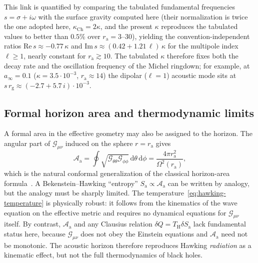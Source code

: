\documentclass[12pt,a4paper,preprint]{elsarticle}
\begin{document}
            This link is quantified by comparing the tabulated fundamental frequencies $s=\sigma+i\omega$ with the surface gravity computed here (their normalization is twice the one adopted here, $\kappa_{\mathrm{Ch}}=2\kappa$, and the present $\kappa$ reproduces the tabulated values to better than $0.5\%$ over $r_{\mathrm{a}}=3$--$30$), yielding the convention-independent ratios $\mathrm{Re}\,s\approx-0.77\,\kappa$ and $\mathrm{Im}\,s\approx(0.42+1.21\,\ell)\,\kappa$ for the multipole index $\ell\ge 1$, nearly constant for $r_{\mathrm{a}}\gtrsim 10$. The tabulated $\kappa$ therefore fixes both the decay rate and the oscillation frequency of the Michel ringdown; for example, at $a_{\infty}=0.1$ ($\kappa=3.5\cdot10^{-3}$, $r_{\mathrm{a}}\approx14$) the dipolar ($\ell=1$) acoustic mode sits at $s\,r_{\mathrm{g}}\approx(-2.7+5.7\,i)\cdot10^{-3}$.

        \subsection{Formal horizon area and thermodynamic limits}\label{subsec:thermodynamic-limits}
            A formal area in the effective geometry may also be assigned to the horizon. The angular part of $\mathcal{G}_{\mu\nu}$ induced on the sphere $r=r_{\mathrm{a}}$ gives
            \begin{equation}
                \mathcal{A}_{\mathrm{a}} = \oint\sqrt{\mathcal{G}_{\theta\theta}\mathcal{G}_{\phi\phi}}\,\mathrm{d}\theta\,\mathrm{d}\phi = \frac{4\pi r^{2}_{\mathrm{a}}}{\Omega^{2}(r_{\mathrm{a}})} ,
                \label{eq:acoustic-horizon-area}
            \end{equation}
            which is the natural conformal generalization of the classical horizon-area formula~\cite{ShapiroSL_TeukolskySA_BlackHolesWhiteDwarfsAndNeutronStarsThePhysicsOfCompactObjects_2004}. A Bekenstein--Hawking ``entropy'' $S_{\mathrm{a}}\propto\mathcal{A}_{\mathrm{a}}$ can be written by analogy, but the analogy must be sharply limited. The temperature~\eqref{eq:hawking-temperature} is physically robust: it follows from the kinematics of the wave equation on the effective metric and requires no dynamical equations for $\mathcal{G}_{\mu\nu}$ itself. By contrast, $\mathcal{A}_{\mathrm{a}}$ and any Clausius relation $\delta Q=T_{\mathrm{H}}\delta S_{\mathrm{a}}$ lack fundamental status here, because $\mathcal{G}_{\mu\nu}$ does not obey the Einstein equations and $\mathcal{A}_{\mathrm{a}}$ need not be monotonic. The acoustic horizon therefore reproduces Hawking \emph{radiation} as a kinematic effect, but not the full thermodynamics of black holes.
\end{document}
